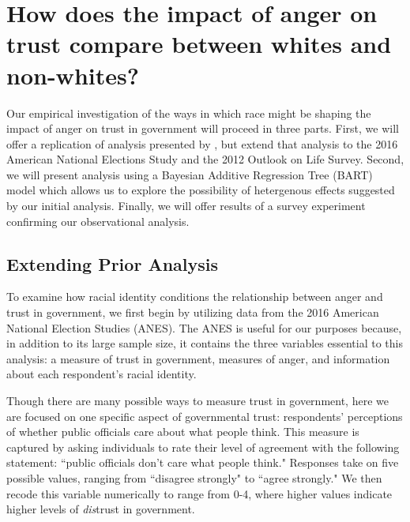 \documentclass[12t, letterpaper]{article}
\begin{document}


\section{How does the impact of anger on trust compare between whites and non-whites?}
\label{sec:design}

Our empirical investigation of the ways in which race might be shaping the impact of anger on trust in government will proceed in three parts. First, we will offer a replication of analysis presented by \citet{webster2017}, but extend that analysis to the 2016 American National Elections Study and the 2012 Outlook on Life Survey. Second, we will present analysis using a  Bayesian Additive Regression Tree (BART) model which allows us to explore the possibility of hetergenous effects suggested by our initial analysis. Finally, we will offer results of a survey experiment confirming our observational analysis.

\subsection{Extending Prior Analysis}
\label{subsec:anes}

To examine how racial identity conditions the relationship between anger and trust in government, we first begin by utilizing data from the 2016 American National Election Studies (ANES). The ANES is useful for our purposes because, in addition to its large sample size, it contains the three variables essential to this analysis: a measure of trust in government, measures of anger, and information about each respondent's racial identity.

Though there are many possible ways to measure trust in government, here we are focused on one specific aspect of governmental trust: respondents' perceptions of whether public officials care about what people think. This measure is captured by asking individuals to rate their level of agreement with the following statement: ``public officials don't care what people think." Responses take on five possible values, ranging from ``disagree strongly" to ``agree strongly." We then recode this variable numerically to range from 0-4, where higher values indicate higher levels of \emph{dis}trust in government.
\end{document}
